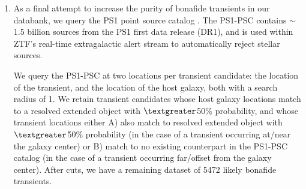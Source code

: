 \documentclass[twocolumn]{aastex63}
\begin{document}
\begin{enumerate}
    \item As a final attempt to increase the purity of bonafide transients in our databank, we query the PS1 point source catalog \citep[PS1-PSC;][]{Tachibana2018}. The PS1-PSC contains $\sim$1.5 billion sources from the PS1 first data release (DR1), and is used within ZTF's real-time extragalactic alert stream to automatically reject stellar sources. \par
    We query the PS1-PSC at two locations per transient candidate: the location of the transient, and the location of the host galaxy, both with a search radius of 1\arcsec. %
    We retain transient candidates whose host galaxy locations match to a resolved extended object with $\textgreater$50\% probability, and whose transient locations either A) also match to resolved extended object with $\textgreater$50\% probability (in the case of a transient occurring at/near the galaxy center) or B) match to no existing counterpart in the PS1-PSC catalog (in the case of a transient occurring far/offset from the galaxy center). After cuts, we have a remaining dataset of 5472 likely bonafide transients.
\end{enumerate}
\end{document}
